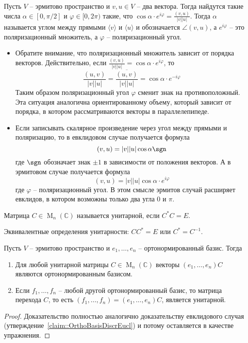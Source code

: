 \begin{definition}
Пусть $V$ -- эрмитово пространство и $v,u\in V$ -- два вектора.
Тогда найдутся такие числа $\alpha\in[0,\pi/2]$ и $\varphi\in [0, 2\pi)$ такие, что $\cos \alpha\cdot e^{i\varphi} = \frac{(v,u)}{|v| |u|}$.
Тогда $\alpha$ называется углом между прямыми $\langle v\rangle$ и $\langle u\rangle$ и обозначается $\angle(v, u)$, а $e^{i\varphi}$ -- это поляризационный множитель, а $\varphi$ -- поляризационный угол.
\end{definition}

\begin{remark}
\begin{itemize}
\item
Обратите внимание, что поляризационный множитель зависит от порядка векторов.
Действительно, если $\frac{(v, u)}{|v| |u|} = \cos \alpha \cdot e^{i\varphi}$, то 
\[
\frac{(u, v)}{|v| |u|} = \frac{\overline{(u, v)}}{|v| |u|} = \cos \alpha\cdot e^{-i\varphi}
\]
Таким образом поляризационный угол $\varphi$ сменит знак на противоположный.
Эта ситуация аналогична ориентированному объему, который зависит от порядка, в котором рассматриваются векторы в параллелепипеде.

\item
Если записывать скалярное произведение через угол между прямыми и поляризацию, то в евклидовом случае получается формула
\[
(v, u) = |v| |u| \cos \alpha \sgn
\]
где $\sgn$ обозначает знак $\pm 1$ в зависимости от положения векторов.
А в эрмитовом случае получается формула
\[
(v, u) = |v| |u| \cos \alpha\cdot  e^{i\varphi}
\]
где $\varphi$ -- поляризационный угол.
В этом смысле эрмитов случай расширяет евклидов, в котором возможны только два угла $0$ и $\pi$.
\end{itemize}
\end{remark}

\begin{definition}
Матрица $C\in \operatorname{M}_n(\mathbb C)$ называется унитарной, если $C^* C = E$.
\end{definition}

Эквивалентные определения унитарности: $CC^* = E$ или $C^* = C^{-1}$.

\begin{claim}
Пусть $V$ -- эрмитово пространство и $e_1,\ldots,e_n$ -- ортонормированный базис.
Тогда
\begin{enumerate}
\item Для любой унитарной матрицы $C\in \operatorname{M}_n(\mathbb C)$ векторы $(e_1,\ldots,e_n)C$ являются ортонормированным базисом.

\item Если $f_1,\ldots,f_n$ -- любой другой ортонормированный базис, то матрица перехода $C$, то есть $(f_1,\ldots,f_n) = (e_1,\ldots,e_n)C$, является унитарной.
\end{enumerate}
\end{claim}
\begin{proof}
Доказательство полностью аналогично доказательству евклидового случая (утверждение~\ref{claim::OrthoBasisDiscrEucl}) и потому оставляется в качестве упражнения.
\end{proof}


